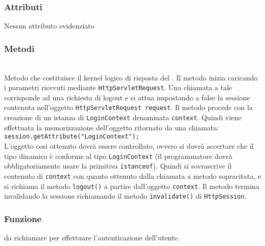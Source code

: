 \subsubsection*{Attributi}

Nessun attributo evidenziato

\subsubsection*{Metodi}
\begin{description}
	\item{}\\
	Metodo che costituisce il kernel logico di risposta del . Il metodo inizia caricando i parametri ricevuti mediante \texttt{HttpServletRequest}. Una chiamata a tale  corrisponde ad una richiesta di logout e si attua impostando a false la sessione contenuta nell'oggetto \texttt{HttpServletRequest request}. Il metodo procede con la creazione di un istanza  di \texttt{LoginContext} denominata \texttt{context}. Quindi viene effettuata la memorizzazione dell'oggetto ritornato da una chiamata:
\\
\verb|session.getAttribute("LoginContext");|
\\

L'oggetto cosi ottenuto dovrà essere controllato, ovvero si dovrà accertare che il tipo dinamico è conforme al tipo \texttt{LoginContext} (il programmatore dovrà obbligatoriamente usare   la primitiva \texttt{istanceof}). Quindi si sovrascrive il contenuto di \texttt{context} con quanto ottenuto dalla chiamata a metodo sopracitata, e si richiama il metodo \texttt{logout()} a partire dall'oggetto \texttt{context}. Il metodo termina invalidando la sessione richiamando il metodo \texttt{invalidate()} di \texttt{HttpSession}.

\end{description}


\subsubsection*{Funzione}
 da richiamare per effettuare l'autenticazione dell'utente.


